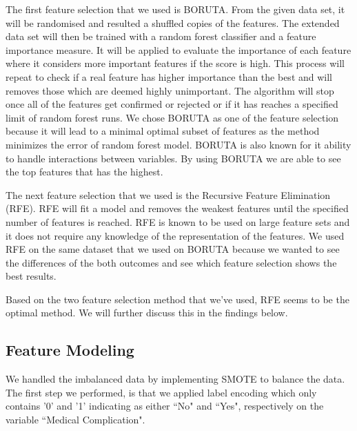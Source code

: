 \documentclass[11pt]{article}
\begin{document}
\hspace{0.5cm}The first feature selection that we used is BORUTA. From the given data set, it will be randomised and resulted a shuffled copies of the features. The extended data set will then be trained with a random forest classifier and a feature importance measure. It will be applied to evaluate the importance of each feature where it considers more important features if the score is high. This process will repeat to check if a real feature has higher importance than the best and will removes those which are deemed highly unimportant. The algorithm will stop once all of the features get confirmed or rejected or if it has reaches a specified limit of random forest runs. We chose BORUTA as one of the feature selection because it will lead to a minimal optimal subset of features as the method minimizes the error of random forest model. BORUTA is also known for it ability to handle interactions between variables. By using BORUTA we are able to see the top features that has the highest.\vspace{0.3cm} 

\hspace{0.5cm} The next feature selection that we used is the Recursive Feature Elimination (RFE). RFE will fit a model and removes the weakest features until the specified number of features is reached. RFE is known to be used on large feature sets and it does not require any knowledge of the representation of the features. We used RFE on the same dataset that we used on BORUTA because we wanted to see the differences of the both outcomes and see which feature selection shows the best results.\vspace{0.3cm}

\hspace{0.5cm} Based on the two feature selection method that we've used, RFE seems to be the optimal method. We will further discuss this in the findings below. 


\subsection{Feature Modeling}
\hspace{0.5cm} We handled the imbalanced data by implementing SMOTE to balance the data. The first step we performed, is that we applied label encoding which only contains '0' and '1' indicating as either ``No" and ``Yes", respectively on the variable ``Medical Complication". \vspace{0.3cm} 
\end{document}
